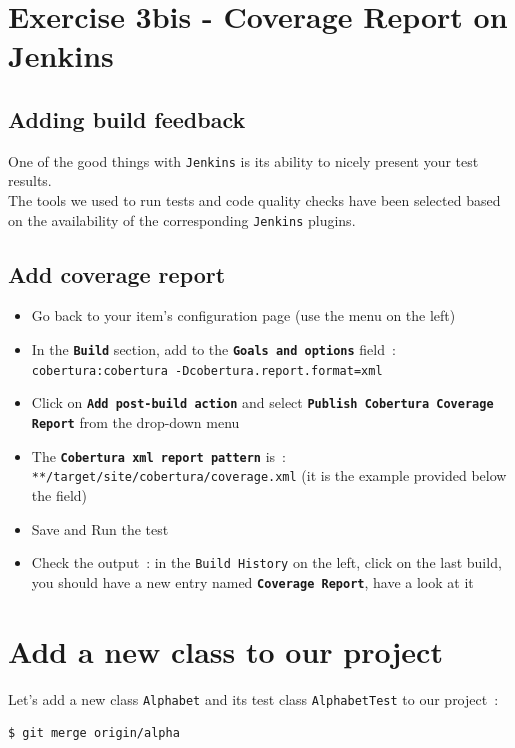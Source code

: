 \documentclass{article}
\begin{document}
\section{Exercise 3bis - Coverage Report on Jenkins}

\subsection{Adding build feedback}
One of the good things with \texttt{Jenkins} is its ability to nicely present your test results. \\
The tools we used to run tests and code quality checks have been selected based on the availability of the corresponding \texttt{Jenkins} plugins.

\subsection{Add coverage report}
\begin{itemize}
\item Go back to your item's configuration page (use the menu on the left)
\item In the \textbf{\texttt{Build}} section, add to the \textbf{\texttt{Goals and options}} field~: \\
\texttt{cobertura:cobertura -Dcobertura.report.format=xml}
\item Click on \textbf{\texttt{Add post-build action}} and select \textbf{\texttt{Publish Cobertura Coverage Report}} from the drop-down menu
\item The \textbf{\texttt{Cobertura xml report pattern}} is~:\\
\texttt{**/target/site/cobertura/coverage.xml} (it is the example provided below the field)
\item Save and Run the test
\item Check the output~: in the \texttt{Build History} on the left, click on the last build, you should have a new entry named \textbf{\texttt{Coverage Report}}, have a look at it
\end{itemize}



\section{Add a new class to our project}

Let's add a new class \texttt{Alphabet} and its test class \texttt{AlphabetTest} to our project~:
\begin{lstlisting}
$ git merge origin/alpha
\end{lstlisting}
\end{document}
